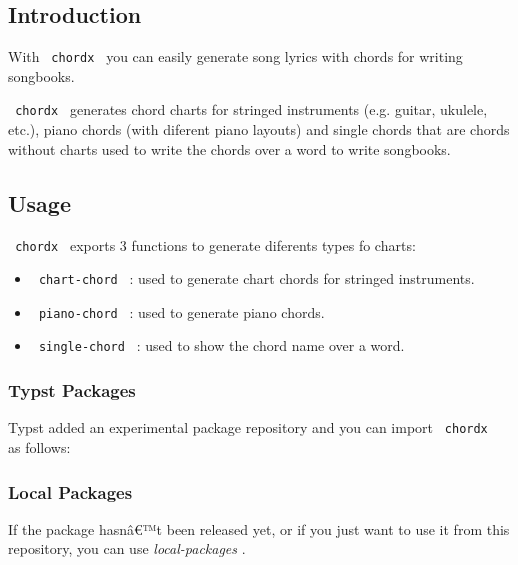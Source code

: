 \subsection{Introduction}\label{introduction}

With \texttt{\ chordx\ } you can easily generate song lyrics with chords
for writing songbooks.

\texttt{\ chordx\ } generates chord charts for stringed instruments
(e.g. guitar, ukulele, etc.), piano chords (with diferent piano layouts)
and single chords that are chords without charts used to write the
chords over a word to write songbooks.

\subsection{Usage}\label{usage}

\texttt{\ chordx\ } exports 3 functions to generate diferents types fo
charts:

\begin{itemize}
\tightlist
\item
  \texttt{\ chart-chord\ } : used to generate chart chords for stringed
  instruments.
\item
  \texttt{\ piano-chord\ } : used to generate piano chords.
\item
  \texttt{\ single-chord\ } : used to show the chord name over a word.
\end{itemize}

\subsubsection{Typst Packages}\label{typst-packages}

Typst added an experimental package repository and you can import
\texttt{\ chordx\ } as follows:

\begin{Shaded}
\begin{Highlighting}[]
\end{Highlighting}
\end{Shaded}

\subsubsection{Local Packages}\label{local-packages}

If the package hasnâ€™t been released yet, or if you just want to use it
from this repository, you can use \emph{\emph{local-packages}} .

